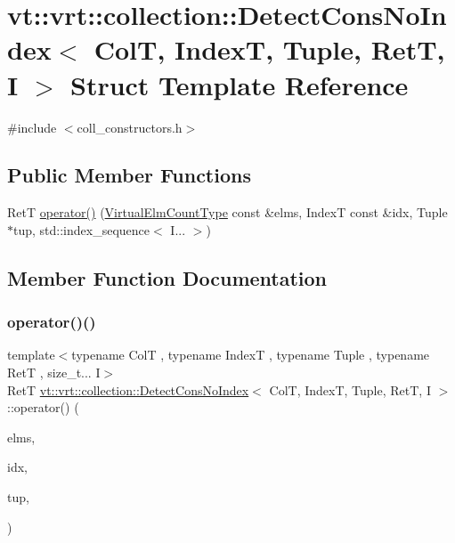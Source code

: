 \hypertarget{structvt_1_1vrt_1_1collection_1_1_detect_cons_no_index}{}\section{vt\+:\+:vrt\+:\+:collection\+:\+:Detect\+Cons\+No\+Index$<$ ColT, IndexT, Tuple, RetT, I $>$ Struct Template Reference}
\label{structvt_1_1vrt_1_1collection_1_1_detect_cons_no_index}


{\ttfamily \#include $<$coll\+\_\+constructors.\+h$>$}

\subsection*{Public Member Functions}
\begin{DoxyCompactItemize}
\item 
RetT \hyperlink{structvt_1_1vrt_1_1collection_1_1_detect_cons_no_index_a9dd40c066aeb03509e4e8b2f9722711c}{operator()} (\hyperlink{namespacevt_ac115668758184050beff7a9281a2c490}{Virtual\+Elm\+Count\+Type} const \&elms, IndexT const \&idx, Tuple $\ast$tup, std\+::index\+\_\+sequence$<$ I... $>$)
\end{DoxyCompactItemize}


\subsection{Member Function Documentation}
\mbox{\label{structvt_1_1vrt_1_1collection_1_1_detect_cons_no_index_a9dd40c066aeb03509e4e8b2f9722711c}} 
\subsubsection{\texorpdfstring{operator()()}{operator()()}}
{\footnotesize\ttfamily template$<$typename ColT , typename IndexT , typename Tuple , typename RetT , size\+\_\+t... I$>$ \\
RetT \hyperlink{structvt_1_1vrt_1_1collection_1_1_detect_cons_no_index}{vt\+::vrt\+::collection\+::\+Detect\+Cons\+No\+Index}$<$ ColT, IndexT, Tuple, RetT, I $>$\+::operator() (\begin{DoxyParamCaption}\item[{\hyperlink{namespacevt_ac115668758184050beff7a9281a2c490}{Virtual\+Elm\+Count\+Type} const \&}]{elms,  }\item[{IndexT const \&}]{idx,  }\item[{Tuple $\ast$}]{tup,  }\item[{std\+::index\+\_\+sequence$<$ I... $>$}]{ }\end{DoxyParamCaption})\hspace{0.3cm}{\ttfamily [inline]}}



